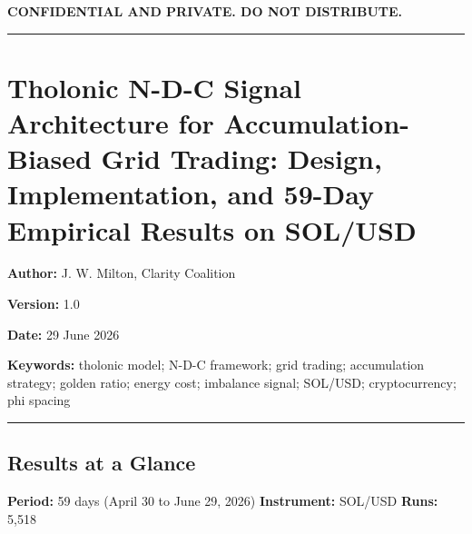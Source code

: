 \documentclass[
  11pt,
  letterpaper,
]{article}
\author{}
\date{}
\begin{document}
\textbf{CONFIDENTIAL AND PRIVATE. DO NOT DISTRIBUTE.}

\begin{center}\rule{0.5\linewidth}{0.5pt}\end{center}

\section{Tholonic N-D-C Signal Architecture for Accumulation-Biased Grid
Trading: Design, Implementation, and 59-Day Empirical Results on
SOL/USD}\label{tholonic-n-d-c-signal-architecture-for-accumulation-biased-grid-trading-design-implementation-and-59-day-empirical-results-on-solusd}

\textbf{Author:} J. W. Milton, Clarity Coalition

\textbf{Version:} 1.0

\textbf{Date:} 29 June 2026

\textbf{Keywords:} tholonic model; N-D-C framework; grid trading;
accumulation strategy; golden ratio; energy cost; imbalance signal;
SOL/USD; cryptocurrency; phi spacing

\begin{center}\rule{0.5\linewidth}{0.5pt}\end{center}

\subsection{Results at a Glance}\label{results-at-a-glance}

\textbf{Period:} 59 days (April 30 to June 29, 2026) \textbar{}
\textbf{Instrument:} SOL/USD \textbar{} \textbf{Runs:} 5,518
\end{document}
